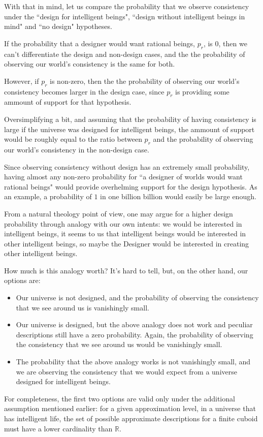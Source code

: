 \documentclass[a4paper
,draft
]{article}
\def\reale{\mathbb{R}}
\newcommand{\ghilimele}[1]{``#1"}
\begin{document}
With that in mind, let us compare the probability that
we observe consistency under the \ghilimele{design for intelligent beings},
\ghilimele{design without intelligent beings in mind} and
\ghilimele{no design} hypotheses.

If the probability that a
designer would want rational beings, $p_r$, is $0$, then we can't
differentiate the design and non-design cases, and the
the probability of observing our world's consistency is the same
for both.

However, if $p_r$ is non-zero, then the
the probability of observing our world's consistency becomes larger in the
design case, since $p_r$ is providing some ammount of support for that
hypothesis.

Oversimplifying a bit, and assuming that the probability of having consistency
is large if the universe was designed for intelligent beings,
the ammount of support would
be roughly equal to the ratio between $p_r$ and the probability of observing
our world's consistency in the non-design case.

Since observing consistency without design has an extremely
small probability,
having almost any non-zero probability for
\ghilimele{a designer of worlds would want rational beings} would provide
overhelming support for the design hypothesis.
As an example, a probability
of $1$ in one billion billion would easily be large enough.

From a natural theology point of view, one may argue for a higher design
probability through analogy with our own intents: we would be interested
in intelligent beings, it seems to us that intelligent beings would be
interested in other intelligent beings, so maybe the Designer would be
interested in creating other intelligent beings.

How much is this analogy worth?
It's hard to tell, but, on the other hand, our options are:

\begin{itemize}
  \item Our universe is not designed,
        and the probability of observing the
        consistency that we see around us is vanishingly small.
  \item Our universe is designed, but the above analogy does not work and
        peculiar descriptions still have a zero probability.
        Again, the probability of observing the
        consistency that we see around us would be vanishingly small.
  \item The probability that the above analogy works is not vanishingly small,
        and we are observing the consistency that we would expect from a
        universe designed for intelligent beings.
\end{itemize}
For completeness, the first two options are valid only under the additional
assumption mentioned earlier:
for a given approximation level, in a universe that has intelligent life,
the set of possible approximate descriptions for a finite cuboid
must have a lower cardinality than $\reale$.
\end{document}
